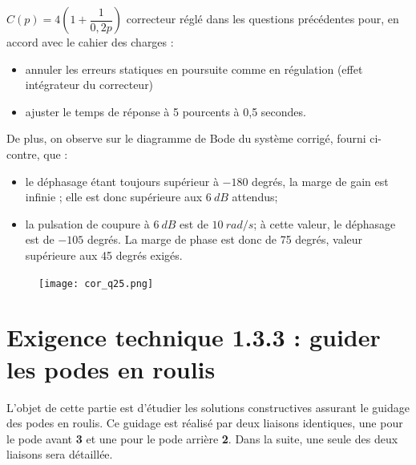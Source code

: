 \ifprof
\begin{corrige}
$C(p)=4\left( 1+\dfrac{1}{0,2p}\right)$ correcteur réglé dans les questions précédentes pour, en accord avec le cahier des charges :
\begin{itemize}
\item annuler les erreurs statiques en poursuite comme en régulation (effet intégrateur du correcteur)
\item ajuster le temps de réponse à 5 pourcents à 0,5 secondes.
\end{itemize}
De plus, on observe sur le diagramme de Bode du système corrigé, fourni ci-contre, que :
\begin{itemize}
\item le déphasage étant toujours supérieur à $-180$ degrés, la marge de gain est infinie ; elle est donc supérieure aux $\SI{6}{dB}$ attendus;
\item la pulsation de coupure à $\SI{6}{dB}$ est de $\SI{10}{rad/s}$; à cette valeur, le déphasage est de $-105$ degrés. La marge de phase est donc de 75 degrés, valeur supérieure aux 45 degrés exigés.
\end{itemize}

\begin{figure}[H]
\centering
\texttt{[image: cor\_q25.png]}
\end{figure}
\end{corrige}
\else
\fi


\section{Exigence technique 1.3.3 : guider les podes en roulis}
\ifprof
\else
L’objet de cette partie est d’étudier les solutions constructives assurant le guidage des podes en roulis. Ce guidage est réalisé par deux liaisons identiques, une pour le pode avant \textbf{3} et une pour le pode arrière \textbf{2}. Dans la suite, une seule des deux liaisons sera détaillée.
\fi

